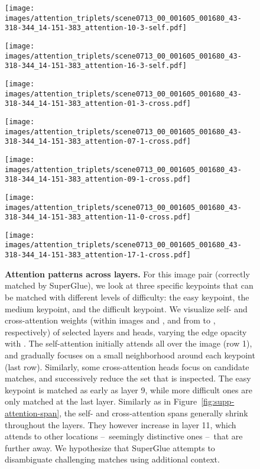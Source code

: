 \documentclass[10pt,twocolumn,letterpaper]{article}
\renewcommand{\*}[1]{\mathbf{#1}}
\newcommand{\0}{\phantom{0}}
\begin{document}
\begin{figure*}[ht!]
\begin{minipage}{\iwidth\textwidth}
    \vspace{.5mm}
    \texttt{[image: images/attention\_triplets/scene0713\_00\_001605\_001680\_43-318-344\_14-151-383\_attention-10-3-self.pdf]}

    \vspace{.5mm}
    \texttt{[image: images/attention\_triplets/scene0713\_00\_001605\_001680\_43-318-344\_14-151-383\_attention-16-3-self.pdf]}
\end{minipage}\hspace{5mm}\begin{minipage}{\iwidth\textwidth}
    \texttt{[image: images/attention\_triplets/scene0713\_00\_001605\_001680\_43-318-344\_14-151-383\_attention-01-3-cross.pdf]}
    
    \vspace{.5mm}
    \texttt{[image: images/attention\_triplets/scene0713\_00\_001605\_001680\_43-318-344\_14-151-383\_attention-07-1-cross.pdf]}
    
    \vspace{.5mm}
    \texttt{[image: images/attention\_triplets/scene0713\_00\_001605\_001680\_43-318-344\_14-151-383\_attention-09-1-cross.pdf]}
    
    \vspace{.5mm}
    \texttt{[image: images/attention\_triplets/scene0713\_00\_001605\_001680\_43-318-344\_14-151-383\_attention-11-0-cross.pdf]}
    
    \vspace{.5mm}
    \texttt{[image: images/attention\_triplets/scene0713\_00\_001605\_001680\_43-318-344\_14-151-383\_attention-17-1-cross.pdf]}
\end{minipage}

\vspace{-.1cm}
\caption{{\bf Attention patterns across layers.} For this image pair (correctly matched by SuperGlue), we look at three specific keypoints that can be matched with different levels of difficulty: the {\color{green}easy keypoint}, the {\color[rgb]{0,.8,1}medium keypoint}, and the {\color{red}difficult keypoint}.
We visualize self- and cross-attention weights (within images  and , and from  to , respectively) of selected layers and heads, varying the edge opacity with .
The self-attention initially attends all over the image (row 1), and gradually focuses on a small neighborhood around each keypoint (last row). Similarly, some cross-attention heads focus on candidate matches, and successively reduce the set that is inspected. The {\color{green}easy keypoint} is matched as early as layer 9, while more difficult ones are only matched at the last layer.
Similarly as in Figure~\ref{fig:supp-attention-span}, the self- and cross-attention spans generally shrink throughout the layers. They however increase in layer 11, which attends to other locations --~seemingly distinctive ones --~that are further away. We hypothesize that SuperGlue attempts to disambiguate challenging matches using additional context.
}
\label{fig:supp-attention-qualitative}
\end{figure*} \fi

\clearpage
{\small


}
\end{document}
